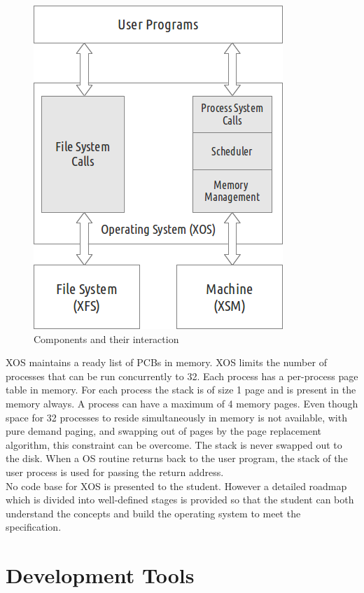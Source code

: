 \documentclass[10pt]{report}
\begin{document}
\begin{figure}[hbtp]
\centering
\includegraphics[scale=0.59]{xosstructure.png}
\caption{Components and their interaction}
\end{figure}

XOS maintains a ready list of PCBs in memory. XOS limits the number of processes that can be run concurrently to 32. Each process has a per-process page table in memory. For each process the stack is of size 1 page and is present in the memory always. A process can have a maximum of 4 memory pages. Even though space for 32 processes to reside simultaneously in memory is not available, with pure demand paging, and swapping out of pages by the page replacement algorithm, this constraint can be overcome. The stack is never swapped out to the disk. When a OS routine returns back to the user program,  the stack of the user process is used for passing the return address. \\

No code base for XOS is presented to the student. However a detailed roadmap which is divided into well-defined stages is provided so that the student can both understand the concepts and build the operating system to meet the specification.




\chapter{Development Tools}
\end{document}

